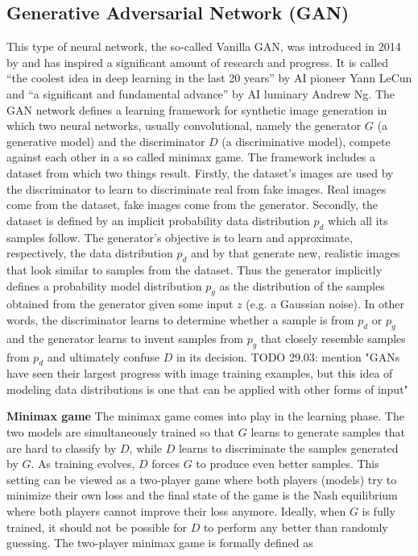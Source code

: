 \documentclass[12pt,a4paper]{article}
\begin{document}
\subsection{Generative Adversarial Network (GAN)}
This type of neural network, the so-called Vanilla GAN, was introduced in 2014 by \cite{1406.2661} and has inspired a significant amount of research and progress. It is called ``the coolest idea in deep learning in the last 20 years'' by AI pioneer Yann LeCun and ``a significant and fundamental advance'' by AI luminary Andrew Ng. The GAN network defines a learning framework for synthetic image generation in which two neural networks, usually convolutional, namely the generator $G$ (a generative model) and the discriminator $D$ (a discriminative model), compete against each other in a so called minimax game. The framework includes a dataset from which two things result. Firstly, the dataset's images are used by the discriminator to learn to discriminate real from fake images. Real images come from the dataset, fake images come from the generator. Secondly, the dataset is defined by an implicit probability data distribution $p_d$ which all its samples follow. The generator's objective is to learn and approximate, respectively, the data distribution $p_d$ and by that generate new, realistic images that look similar to samples from the dataset. Thus the generator implicitly defines a probability model distribution $p_g$ as the distribution of the samples obtained from the generator given some input $z$ (e.g. a Gaussian noise). In other words, the discriminator learns to determine whether a sample is from $p_d$ or $p_g$ and the generator learns to invent samples from $p_g$ that closely resemble samples from $p_d$ and ultimately confuse $D$ in its decision. TODO 29.03: mention "GANs have seen their largest progress with image training examples, but this idea of modeling data distributions is one that can be applied with other forms of input"
\par \textbf{Minimax game} The minimax game comes into play in the learning phase. The two models are simultaneously trained so that $G$ learns to generate samples that are hard to classify by $D$, while $D$ learns to discriminate the samples generated by $G$. As training evolves, $D$ forces $G$ to produce even better samples. This setting can be viewed as a two-player game where both players (models) try to minimize their own loss and the final state of the game is the Nash equilibrium where both players cannot improve their loss anymore. Ideally, when $G$ is fully trained, it should not be possible for $D$ to perform any better than randomly guessing. The two-player minimax game is formally defined as
\end{document}
